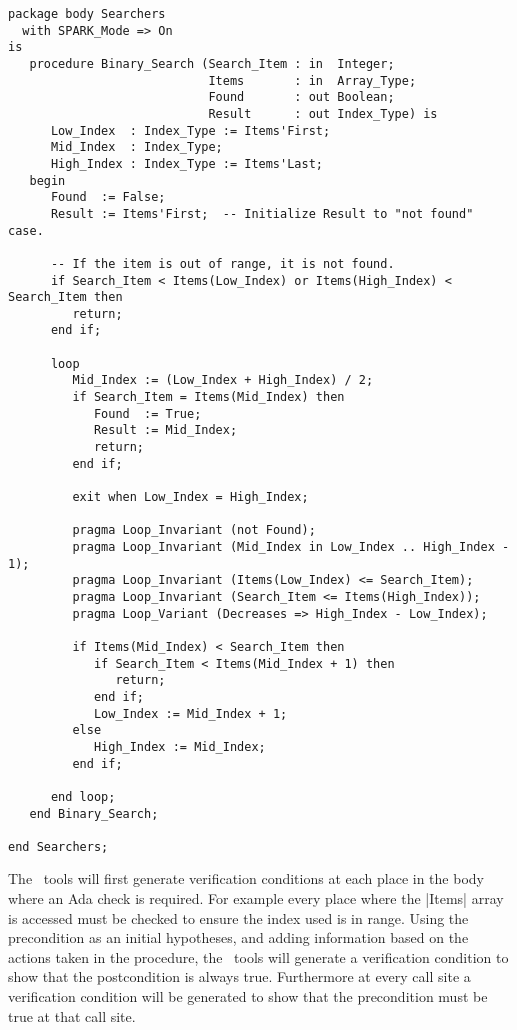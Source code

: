 \begin{lstlisting}
package body Searchers
  with SPARK_Mode => On
is
   procedure Binary_Search (Search_Item : in  Integer;
                            Items       : in  Array_Type;
                            Found       : out Boolean;
                            Result      : out Index_Type) is
      Low_Index  : Index_Type := Items'First;
      Mid_Index  : Index_Type;
      High_Index : Index_Type := Items'Last;
   begin
      Found  := False;
      Result := Items'First;  -- Initialize Result to "not found" case.

      -- If the item is out of range, it is not found.
      if Search_Item < Items(Low_Index) or Items(High_Index) < Search_Item then
         return;
      end if;

      loop
         Mid_Index := (Low_Index + High_Index) / 2;
         if Search_Item = Items(Mid_Index) then
            Found  := True;
            Result := Mid_Index;
            return;
         end if;

         exit when Low_Index = High_Index;

         pragma Loop_Invariant (not Found);
         pragma Loop_Invariant (Mid_Index in Low_Index .. High_Index - 1);
         pragma Loop_Invariant (Items(Low_Index) <= Search_Item);
         pragma Loop_Invariant (Search_Item <= Items(High_Index));
         pragma Loop_Variant (Decreases => High_Index - Low_Index);

         if Items(Mid_Index) < Search_Item then
            if Search_Item < Items(Mid_Index + 1) then
               return;
            end if;
            Low_Index := Mid_Index + 1;
         else
            High_Index := Mid_Index;
         end if;

      end loop;
   end Binary_Search;

end Searchers;
\end{lstlisting}

The \SPARK\ tools will first generate verification conditions at each place in the body where an
Ada check is required. For example every place where the |Items| array is accessed must be
checked to ensure the index used is in range. Using the precondition as an initial hypotheses,
and adding information based on the actions taken in the procedure, the \SPARK\ tools will
generate a verification condition to show that the postcondition is always true. Furthermore at
every call site a verification condition will be generated to show that the precondition must be
true at that call site.

